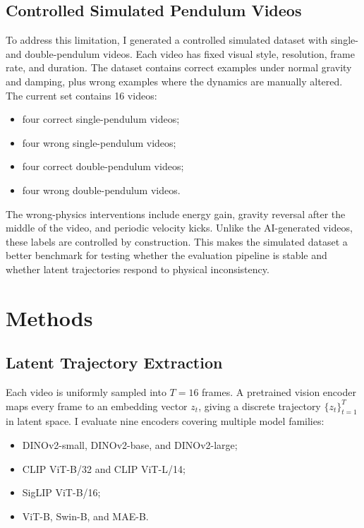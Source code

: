 \documentclass[final-report]{report-template}
\begin{document}
\subsection{Controlled Simulated Pendulum Videos}
To address this limitation, I generated a controlled simulated dataset with
single- and double-pendulum videos. Each video has fixed visual style,
resolution, frame rate, and duration. The dataset contains correct examples
under normal gravity and damping, plus wrong examples where the dynamics are
manually altered. The current set contains 16 videos:

\begin{itemize}
    \item four correct single-pendulum videos;
    \item four wrong single-pendulum videos;
    \item four correct double-pendulum videos;
    \item four wrong double-pendulum videos.
\end{itemize}

The wrong-physics interventions include energy gain, gravity reversal after the
middle of the video, and periodic velocity kicks. Unlike the AI-generated
videos, these labels are controlled by construction. This makes the simulated
dataset a better benchmark for testing whether the evaluation pipeline is
stable and whether latent trajectories respond to physical inconsistency.

\section{Methods}
\subsection{Latent Trajectory Extraction}
Each video is uniformly sampled into $T=16$ frames. A pretrained vision encoder
maps every frame to an embedding vector $z_t$, giving a discrete trajectory
$\{z_t\}_{t=1}^{T}$ in latent space. I evaluate nine encoders covering multiple
model families:

\begin{itemize}
    \item DINOv2-small, DINOv2-base, and DINOv2-large;
    \item CLIP ViT-B/32 and CLIP ViT-L/14;
    \item SigLIP ViT-B/16;
    \item ViT-B, Swin-B, and MAE-B.
\end{itemize}
\end{document}
